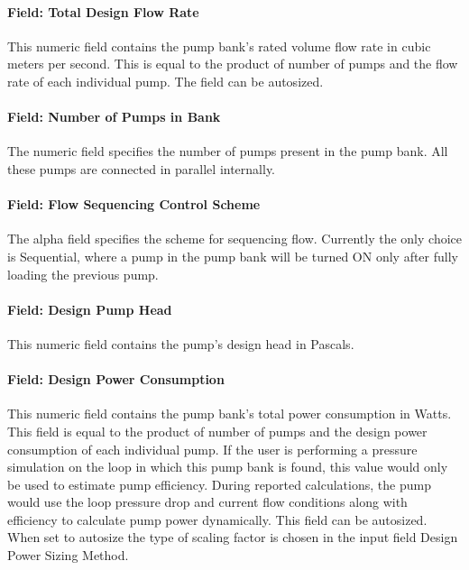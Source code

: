 \paragraph{Field: Total Design Flow Rate}\label{field-total-design-flow-rate-1}

This numeric field contains the pump bank's rated volume flow rate in cubic meters per second. This is equal to the product of number of pumps and the flow rate of each individual pump. The field can be autosized.

\paragraph{Field: Number of Pumps in Bank}\label{field-number-of-pumps-in-bank-1}

The numeric field specifies the number of pumps present in the pump bank. All these pumps are connected in parallel internally.

\paragraph{Field: Flow Sequencing Control Scheme}\label{field-flow-sequencing-control-scheme-1}

The alpha field specifies the scheme for sequencing flow. Currently the only choice is Sequential, where a pump in the pump bank will be turned ON only after fully loading the previous pump.

\paragraph{Field: Design Pump Head}\label{field-design-pump-head-4}

This numeric field contains the pump's design head in Pascals.

\paragraph{Field: Design Power Consumption}\label{field-design-power-consumption-4}

This numeric field contains the pump bank's total power consumption in Watts. This field is equal to the product of number of pumps and the design power consumption of each individual pump. If the user is performing a pressure simulation on the loop in which this pump bank is found, this value would only be used to estimate pump efficiency. During reported calculations, the pump would use the loop pressure drop and current flow conditions along with efficiency to calculate pump power dynamically. This field can be autosized. When set to autosize the type of scaling factor is chosen in the input field Design Power Sizing Method.

